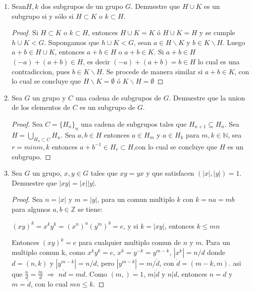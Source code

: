 \documentclass{article}
\theoremstyle{break}
\begin{document}
\begin{enumerate}
			\begin{proof}
				Sabemos de algebra lineal que si una matriz invertible con entradas enteras tiene su inversa con entradas enteras. A demás $detA^{-1}=\frac{1}{detA}=\pm 1$ por tanto si $A\in H$ entonces $A^{-1}\in H$. La matriz identidad tambien esta en $H$ y la asociatividad de matrices se hereda. Se sigue que $H<G$.
			\end{proof}
		
		\item Sean$H,k$ dos subgrupos de un grupo $G$. Demuestre que $H\cup K$ es un subgrupo si y sólo si $H\subset K$ o $k\subset H$.
		
			\begin{proof}
				Si $H\subset K$ o $k\subset H$, entonces $H\cup K=K$ \'o $H\cup K=H$ y se cumple $h\cup K<G$.
				Supongamos que $h\cup K<G$, sean $a\in H\backslash K$ y $b\in K\backslash H$. Luego $a+b\in H\cup K$, entonces $a+b\in H$ o $a+b\in K$. Si $a+b\in H$ $(-a)+(a+b)\in H$, es decir $(-a)+(a+b)=b\in H$ lo cual es una contradiccion, pues $b\in K\backslash H$. Se procede de manera similar si $a+b\in K$, con lo cual se concluye que $H\backslash K=\emptyset$ \'o $K\backslash H=\emptyset$
			\end{proof}
			
		\item Sea $G$ un grupo y $C$ una cadena de subgrupos de $G$. Demuestre que la union de los elementos de $C$ es un subgrupo de $G$.
			\begin{proof}
				Sea $C=\{H_n\}_n$ una cadena de subgrupos tales que $H_{n+1}\subseteq H_n$. Sea $H=\bigcup_{H_n\subset C}{H_n}$. Sea $a,b\in H$ entonces $a\in H_m$ y $a\in H_k$ para $m,k\in\mathbb{N}$, sea $r=min{m,k}$ entonces $a+b^{-1}\in H_r\subset H$,con lo cual se concluye que $H$ es un subgrupo.
			\end{proof}
			
			\item Sea $G$ un grupo, $x,y\in G$ tales que $xy=yx$ y que satisfacen $(|x|,|y|)=1$. Demuestre que $|xy|=|x||y|$.
			
			\begin{proof}
				Sea $n=|x|$ y $m=|y|$, para un comun multiplo $k$ con $k=na=mb$ para algunos $a,b\in\mathbb{Z}$ se tiene:
				
				$(xy)^k=x^k y^k=(x^n)^a (y^m)^b=e$, y si $k=|xy|$, entonces $k\leq mn$
				
				Entonces $(xy)^k=e$ para cualquier multiplo comun de $n$ y $m$.
				Para un multiplo comun k, como $x^ky^k=e$, $x^k=y^{-k}=y^{m-k}$, $|x^k|=n/d$ donde $d=(n,k)$ y $|y^{m-k}|=n/d$, pero $|y^{m-k}|=m/\acute{d}$, con $\acute{d}=(m-k,m)$. asi que $\frac{n}{d}=\frac{\acute{m}}{d}$ $\Rightarrow$ $n\acute{d}=md$. Como $(m,)=1$, $m|\acute{d}$ y $n|d$, entonces $n=d$ y $m=\acute{d}$, con lo cual $mn\leq k$.
			\end{proof}
		

\end{enumerate}
\end{document}
